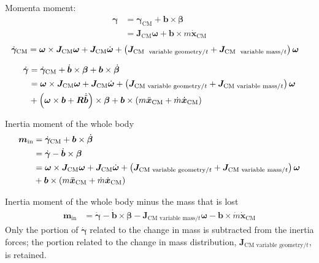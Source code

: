 \documentclass[10pt,fleqn,subeqn]{report}
\newcommand{\T}[1]{\bm{#1}}
\newcommand{\TT}[1]{\bm{#1}}
\begin{document}
Momenta moment:
\begin{align}
	\T{\gamma}
	&=
	\T{\gamma}_\text{CM}
	+
	\T{b} \times \T{\beta}
	\nonumber \\
	&=
	\TT{J}_\text{CM} \T{\omega}
	+
	\T{b} \times m \dot{\T{x}}_\text{CM}
\end{align}
\begin{align}
	\dot{\T{\gamma}}_\text{CM}
	&=
	\T{\omega} \times \TT{J}_\text{CM} \T{\omega}
	+
	\TT{J}_\text{CM} \dot{\T{\omega}}
	+
	\plbr{
		\TT{J}_{\text{CM \ variable geometry}/t}
		+
		\TT{J}_{\text{CM \ variable mass}/t}
	} \T{\omega}
\end{align}

\begin{align}
	\dot{\T{\gamma}}
	&=
	\dot{\T{\gamma}}_\text{CM}
	+
	\dot{\T{b}} \times \T{\beta}
	+
	\T{b} \times \dot{\T{\beta}}
	\nonumber \\
	&=
	\T{\omega} \times \TT{J}_\text{CM} \T{\omega}
	+
	\TT{J}_\text{CM} \dot{\T{\omega}}
	+
	\plbr{
		\TT{J}_{\text{CM variable geometry}/t}
		+
		\TT{J}_{\text{CM variable mass}/t}
	} \T{\omega}
	\nonumber \\
	&\mbox{}
	+ \plbr{
		\T{\omega} \times \T{b}
		+
		\TT{R} \dot{\tilde{\T{b}}}
	} \times \T{\beta}
	+
	\T{b} \times \plbr{
		m \ddot{\T{x}}_\text{CM}
		+
		\dot{m} \dot{\T{x}}_\text{CM}
	}
\end{align}

Inertia moment of the whole body
\begin{align}
	\T{m}_\text{in}
	&=
	\dot{\T{\gamma}}_\text{CM}
	+
	\T{b} \times \dot{\T{\beta}}
	\nonumber \\
	&=
	\dot{\T{\gamma}}
	-
	\dot{\T{b}} \times \T{\beta}
	\nonumber \\
	&=
	\T{\omega} \times \TT{J}_\text{CM} \T{\omega}
	+
	\TT{J}_\text{CM} \dot{\T{\omega}}
	+
	\plbr{
		\TT{J}_{\text{CM variable geometry}/t}
		+
		\TT{J}_{\text{CM variable mass}/t}
	} \T{\omega}
	\nonumber \\
	&\mbox{}
	+
	\T{b} \times \plbr{
		m \ddot{\T{x}}_\text{CM}
		+
		\dot{m} \dot{\T{x}}_\text{CM}
	}
\end{align}

Inertia moment of the whole body minus the mass that is lost
\begin{align}
	\T{m}_\text{in}
	&=
	\dot{\T{\gamma}}
	-
	\dot{\T{b}} \times \T{\beta}
	-
	\TT{J}_{\text{CM variable mass}/t} \T{\omega}
	-
	\T{b} \times \dot{m} \dot{\T{x}}_\text{CM}
\end{align}
Only the portion of $\dot{\T{\gamma}}$ related to the change in mass
is subtracted from the inertia forces; the portion related
to the change in mass distribution,
$\TT{J}_{\text{CM variable geometry}/t}$,
is retained.
\end{document}
